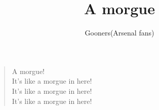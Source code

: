 \documentclass[a4paper,12pt]{article}
\title{A morgue}
\author{Gooners(Arsenal fans)}
\date{}
\begin{document}
	
	\maketitle
	
	\begin{verse}
		
		A morgue! \\
		It's like a morgue in here! \\
		It's like a morgue in here! \\
		It's like a morgue in here!
		
	\end{verse}
	
\end{document}
